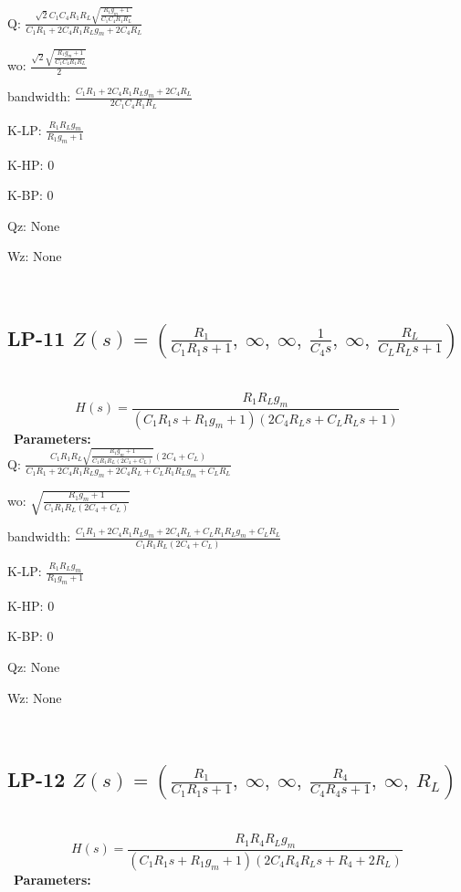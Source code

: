 \documentclass{article}
\begin{document}
Q: $\frac{\sqrt{2} C_{1} C_{4} R_{1} R_{L} \sqrt{\frac{R_{1} g_{m} + 1}{C_{1} C_{4} R_{1} R_{L}}}}{C_{1} R_{1} + 2 C_{4} R_{1} R_{L} g_{m} + 2 C_{4} R_{L}}$\ 

wo: $\frac{\sqrt{2} \sqrt{\frac{R_{1} g_{m} + 1}{C_{1} C_{4} R_{1} R_{L}}}}{2}$\ 

bandwidth: $\frac{C_{1} R_{1} + 2 C_{4} R_{1} R_{L} g_{m} + 2 C_{4} R_{L}}{2 C_{1} C_{4} R_{1} R_{L}}$\ 

K-LP: $\frac{R_{1} R_{L} g_{m}}{R_{1} g_{m} + 1}$\ 

K-HP: $0$\ 

K-BP: $0$\ 

Qz: $\text{None}$\ 

Wz: $\text{None}$\ 

\ 

\subsection{LP-11 $Z(s) = \left( \frac{R_{1}}{C_{1} R_{1} s + 1}, \  \infty, \  \infty, \  \frac{1}{C_{4} s}, \  \infty, \  \frac{R_{L}}{C_{L} R_{L} s + 1}\right)$ } \ 
\textbf{\[H(s) = \frac{R_{1} R_{L} g_{m}}{\left(C_{1} R_{1} s + R_{1} g_{m} + 1\right) \left(2 C_{4} R_{L} s + C_{L} R_{L} s + 1\right)}\] } \ 
\textbf{Parameters:}\\ 

Q: $\frac{C_{1} R_{1} R_{L} \sqrt{\frac{R_{1} g_{m} + 1}{C_{1} R_{1} R_{L} \left(2 C_{4} + C_{L}\right)}} \left(2 C_{4} + C_{L}\right)}{C_{1} R_{1} + 2 C_{4} R_{1} R_{L} g_{m} + 2 C_{4} R_{L} + C_{L} R_{1} R_{L} g_{m} + C_{L} R_{L}}$\ 

wo: $\sqrt{\frac{R_{1} g_{m} + 1}{C_{1} R_{1} R_{L} \left(2 C_{4} + C_{L}\right)}}$\ 

bandwidth: $\frac{C_{1} R_{1} + 2 C_{4} R_{1} R_{L} g_{m} + 2 C_{4} R_{L} + C_{L} R_{1} R_{L} g_{m} + C_{L} R_{L}}{C_{1} R_{1} R_{L} \left(2 C_{4} + C_{L}\right)}$\ 

K-LP: $\frac{R_{1} R_{L} g_{m}}{R_{1} g_{m} + 1}$\ 

K-HP: $0$\ 

K-BP: $0$\ 

Qz: $\text{None}$\ 

Wz: $\text{None}$\ 

\ 

\subsection{LP-12 $Z(s) = \left( \frac{R_{1}}{C_{1} R_{1} s + 1}, \  \infty, \  \infty, \  \frac{R_{4}}{C_{4} R_{4} s + 1}, \  \infty, \  R_{L}\right)$ } \ 
\textbf{\[H(s) = \frac{R_{1} R_{4} R_{L} g_{m}}{\left(C_{1} R_{1} s + R_{1} g_{m} + 1\right) \left(2 C_{4} R_{4} R_{L} s + R_{4} + 2 R_{L}\right)}\] } \ 
\textbf{Parameters:}\\ 
\end{document}
